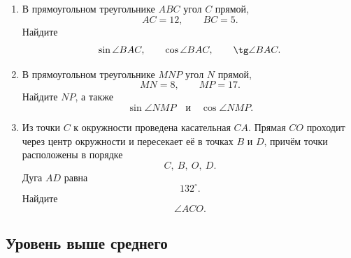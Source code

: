 \documentclass[a4paper,12pt]{article}
\begin{document}
\begin{enumerate}[label=\textbf{\arabic*.}]

  \item
  В прямоугольном треугольнике \(ABC\)
  угол \(C\) прямой,
  \[
  AC=12,
  \qquad
  BC=5.
  \]
  Найдите
  \[
  \sin\angle BAC,
  \qquad
  \cos\angle BAC,
  \qquad
  \tg\angle BAC.
  \]

  \item
  В прямоугольном треугольнике \(MNP\)
  угол \(N\) прямой,
  \[
  MN=8,
  \qquad
  MP=17.
  \]
  Найдите \(NP\), а также
  \[
  \sin\angle NMP
  \quad\text{и}\quad
  \cos\angle NMP.
  \]

  \item
  Из точки \(C\) к окружности
  проведена касательная \(CA\).
  Прямая \(CO\) проходит через центр окружности
  и пересекает её в точках \(B\) и \(D\),
  причём точки расположены в порядке
  \[
  C,\ B,\ O,\ D.
  \]
  Дуга \(AD\) равна
  \[
  132^\circ.
  \]
  Найдите
  \[
  \angle ACO.
  \]

\end{enumerate}

\subsection*{Уровень выше среднего}
\end{document}
